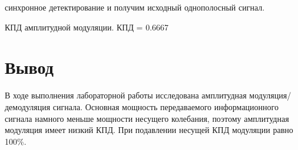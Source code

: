 \documentclass[a4paper,12pt]{article}
\begin{document}
\begin{enumerate}
{ синхронное детектирование и получим исходный однополосный сигнал.
\\}

{ КПД амплитудной модуляции.
КПД = 0.6667
\\}

\section{Вывод}

В ходе выполнения лабораторной работы исследована амплитудная модуляция/демодуляция сигнала. Основная мощность передаваемого информационного сигнала намного меньше мощности несущего колебания, поэтому амплитудная модуляция имеет низкий КПД. При подавлении несущей КПД модуляции равно 100\%.

\end{enumerate}
\end{document}

